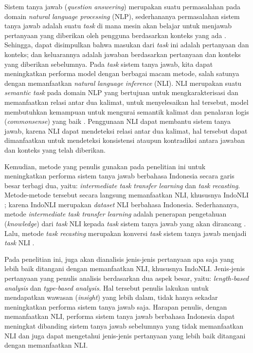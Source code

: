  Sistem tanya jawab (\emph{question answering}) merupakan suatu permasalahan pada domain \emph{natural language processing} (NLP), sederhananya permasalahan sistem tanya jawab adalah suatu \emph{task} di mana mesin akan belajar untuk menjawab pertanyaan yang diberikan oleh pengguna berdasarkan konteks yang ada \citep{stroh2016question}. Sehingga, dapat disimpulkan bahwa masukan dari \emph{task} ini adalah pertanyaan dan konteks; dan keluarannya adalah jawaban berdasarkan pertanyaan dan konteks yang diberikan sebelumnya. Pada \emph{task} sistem tanya jawab, kita dapat meningkatkan performa model dengan berbagai macam metode, salah satunya dengan memanfaatkan \emph{natural language inference} (NLI). NLI merupakan suatu \emph{semantic task} pada domain NLP yang bertujuan untuk mengkarakterisasi dan memanfaatkan relasi antar dua kalimat, untuk menyelesaikan hal tersebut, model membutuhkan kemampuan untuk mengurai semantik kalimat dan penalaran logis (\emph{commonsense}) yang baik \citep{bowman-etal-2015-large}. Penggunaan NLI dapat membantu sistem tanya jawab, karena NLI dapat mendeteksi relasi antar dua kalimat, hal tersebut dapat dimanfaatkan untuk mendeteksi konsistensi ataupun kontradiksi antara jawaban dan konteks yang telah diberikan.

Kemudian, metode yang penulis gunakan pada penelitian ini untuk meningkatkan performa sistem tanya jawab berbahasa Indonesia secara garis besar terbagi dua, yaitu: \emph{intermediate task transfer learning} dan \emph{task recasting}. Metode-metode tersebut secara langsung memanfaatkan NLI, khususnya IndoNLI \citep{mahendra-etal-2021-indonli}; karena IndoNLI merupakan \emph{dataset} NLI berbahasa Indonesia. Sederhananya, metode \emph{intermediate task transfer learning} adalah penerapan pengetahuan (\emph{knowledge}) dari \emph{task} NLI kepada \emph{task} sistem tanya jawab yang akan dirancang \citep{pruksachatkun-etal-2020-intermediate}. Lalu, metode \emph{task recasting} merupakan konversi \emph{task} sistem tanya jawab menjadi \emph{task} NLI \citep{chen-etal-2021-nli-models}.

Pada penelitian ini, juga akan dianalisis jenis-jenis pertanyaan apa saja yang  lebih baik ditangani dengan memanfaatkan NLI, khususnya IndoNLI. Jenis-jenis pertanyaan yang penulis analisis berdasarkan dua aspek besar, yaitu: \emph{length-based analysis} dan \emph{type-based analysis}. Hal tersebut penulis lakukan untuk mendapatkan wawasan (\emph{insight}) yang lebih dalam, tidak hanya sekadar meningkatkan performa sistem tanya jawab saja. Harapan penulis, dengan memanfaatkan NLI, performa sistem tanya jawab berbahasa Indonesia dapat meningkat dibanding sistem tanya jawab sebelumnya yang tidak memanfaatkan NLI dan juga dapat mengetahui jenis-jenis pertanyaan yang lebih baik ditangani dengan memanfaatkan NLI.

